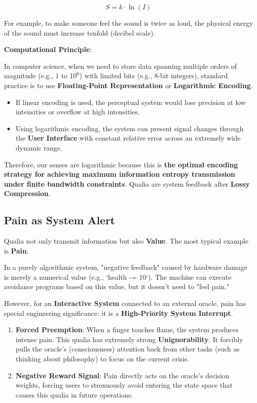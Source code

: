 \begin{equation}
S = k \cdot \ln(I)
\end{equation}

For example, to make someone feel the sound is twice as loud, the physical energy of the sound must increase tenfold (decibel scale).

\textbf{Computational Principle}:

In computer science, when we need to store data spanning multiple orders of magnitude (e.g., $1$ to $10^6$) with limited bits (e.g., 8-bit integers), standard practice is to use \textbf{Floating-Point Representation} or \textbf{Logarithmic Encoding}.

\begin{itemize}
\item If linear encoding is used, the perceptual system would lose precision at low intensities or overflow at high intensities.

\item Using logarithmic encoding, the system can present signal changes through the \textbf{User Interface} with constant relative error across an extremely wide dynamic range.
\end{itemize}

Therefore, our senses are logarithmic because this is \textbf{the optimal encoding strategy for achieving maximum information entropy transmission under finite bandwidth constraints}. Qualia are system feedback after \textbf{Lossy Compression}.

\subsection{Pain as System Alert}

Qualia not only transmit information but also \textbf{Value}. The most typical example is \textbf{Pain}.

In a purely algorithmic system, "negative feedback" caused by hardware damage is merely a numerical value (e.g., `health -= 10`). The machine can execute avoidance programs based on this value, but it doesn't need to "feel pain."

However, for an \textbf{Interactive System} connected to an external oracle, pain has special engineering significance: it is a \textbf{High-Priority System Interrupt}.

\begin{enumerate}
\item \textbf{Forced Preemption}: When a finger touches flame, the system produces intense pain. This qualia has extremely strong \textbf{Unignorability}. It forcibly pulls the oracle's (consciousness) attention back from other tasks (such as thinking about philosophy) to focus on the current crisis.

\item \textbf{Negative Reward Signal}: Pain directly acts on the oracle's decision weights, forcing users to strenuously avoid entering the state space that causes this qualia in future operations.
\end{enumerate}

